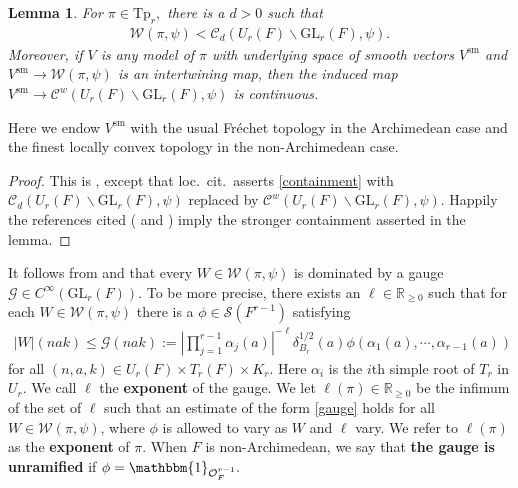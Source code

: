 \documentclass[12pt]{amsart}
\newtheorem{lem}[thm]{Lemma}
\theoremstyle{remark}
\numberwithin{equation}{section}
\newcommand{\GL}{\mathrm{GL}}
\newcommand{\OO}{\mathcal{O}}
\newcommand{\RR}{\mathbb{R}}
\theoremstyle{definition}
\numberwithin{equation}{subsection}
\newcommand{\one}{\mathbbm{1}}
\begin{document}
\begin{lem}\label{lem:whittakerweak}
For $\pi \in \mathrm{Tp}_r,$ there is a $d>0$ such that 
\begin{align} \label{containment}
\mathcal{W}(\pi,\psi) <\mathcal{C}_d(U_r(F) \backslash \GL_r(F),\psi).
\end{align}
Moreover, if $V$ is any model of $\pi$ with underlying space of smooth vectors $V^{\mathrm{sm}}$ and $V^{\mathrm{sm}} \to \mathcal{W}(\pi,\psi)$ is an intertwining map, then the induced map $V^{\mathrm{sm}} \to \mathcal{C}^w(U_r(F) \backslash \GL_r(F),\psi)$ is continuous.
\end{lem}
\noindent Here we endow $V^{\mathrm{sm}}$ with the usual Fr\'echet topology in the Archimedean case and the finest locally convex topology in the non-Archimedean case.

\begin{proof}
This is \cite[Lemma 2.8.1]{BP:GLn}, except that loc.~cit.~asserts \eqref{containment} with \sloppy $\mathcal{C}_d(U_r(F) \backslash \GL_r(F),\psi)$ replaced by $\mathcal{C}^w(U_r(F) \backslash \GL_r(F),\psi).$  Happily the references cited (\cite[\S 15.7.3]{Wallach:RGII} and \cite[Theorem 3.1]{Lapid:Mao:Asymp}) imply the stronger containment asserted in the lemma.
\end{proof}



  It follows from \cite[Proposition 2.2]{JPSSGL3I} and \cite[(8.3)]{JPSSGL3II} that every $W\in \mathcal{W}(\pi,\psi)$ is dominated by a gauge $\mathcal{G} \in C^\infty(\GL_r(F))$. To be more precise, there exists an $\ell\in \RR_{\ge 0}$ such that for each $W\in \mathcal{W}(\pi,\psi)$ there is a $\phi\in \mathcal{S}(F^{r-1})$ satisfying
\begin{align} \label{gauge}
    |W|(nak)\le \mathcal{G}(nak):=\left|\prod_{j=1}^{r-1} \alpha_j(a) \right|^{-\ell}\delta_{B_r}^{1/2}(a)\phi(\alpha_1(a),\cdots, \alpha_{r-1}(a))
\end{align}
for all $(n,a,k)\in U_r(F)\times T_r(F)\times K_r$. Here $\alpha_i$ is the $i$th simple root of $T_r$ in $U_r.$ We call $\ell$ the \textbf{exponent} of the gauge.  We let $\ell(\pi) \in \RR_{\geq 0}$ be the infimum of the set of $\ell$ such that an estimate of the form \eqref{gauge} holds for all $W \in \mathcal{W}(\pi,\psi)$, where $\phi$ is allowed to vary as $W$ and $\ell$ vary.
We refer to $\ell(\pi)$ as the \textbf{exponent} of $\pi.$  When $F$ is non-Archimedean, we say that \textbf{the gauge is unramified} if $\phi=\one_{\OO_F^{r-1}}.$ 
\end{document}

